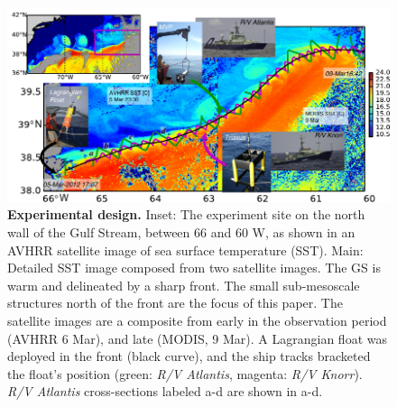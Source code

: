 \documentclass{article}
\begin{document}
\begin{figure}[htbp]
  \centering
    \includegraphics[width=\textwidth]{./SatOverviewSecDTry2.pdf}
   \caption{{\bf Experimental design.}  Inset: The experiment site on the north wall of the Gulf Stream, between 66 and 60 W, as shown in an AVHRR satellite image of sea surface temperature (SST).  Main:  Detailed SST image composed from two satellite images.    The GS is warm and delineated by a sharp front.  The small sub-mesoscale structures north of the front are the focus of this paper.  The satellite images are a composite from early in the observation period (AVHRR 6 Mar), and late (MODIS, 9 Mar).  A Lagrangian float was deployed in the front (black curve), and the ship tracks bracketed the float's position (green: \emph{R/V Atlantis}, magenta: \emph{R/V Knorr}). \emph{R/V Atlantis} cross-sections labeled a-d are shown in a-d.  }\label{fig:SatOverviewSectD}
\end{figure}
\end{document}
